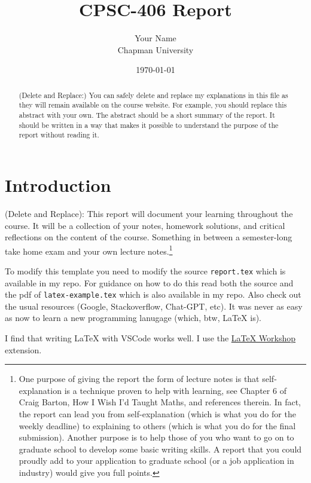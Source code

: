 \documentclass{article}
\title{CPSC-406 Report}
\author{Your Name  \\ Chapman University}
\date{\today}
\theoremstyle{theorem}
\theoremstyle{definition}
\theoremstyle{remark}
\begin{document}
\maketitle

\begin{abstract}
(Delete and Replace:) You can safely delete and replace my explanations in this file as they will remain available on the course website. For example, you should replace this abstract with your own. The abstract should be a short summary of the report. It should be written in a way that makes it possible to understand the purpose of the report without reading it.  
\end{abstract}

\setcounter{tocdepth}{3}
\tableofcontents

\section{Introduction}\label{intro}

(Delete and Replace): This report will document your learning throughout the course. It will be a collection of your notes, homework solutions, and critical reflections on the content of the course. Something in between a semester-long take home exam and your own lecture notes.\footnote{One purpose of giving the report the form of lecture notes is that self-explanation is a technique proven to help with learning, see Chapter 6 of Craig Barton, How I Wish I'd Taught Maths, and references therein. In fact, the report can lead you from self-explanation (which is what you do for the weekly deadline) to explaining to others (which is what you do for the final submission). Another purpose is to help those of you who want to go on to graduate school to develop some basic writing skills. A report that you could proudly add to your application to graduate school (or a job application in industry) would give you full points.}

To modify this template you need to modify the source \texttt{report.tex} which is available in my repo. For guidance on how to do this read both the source and the pdf of \texttt{latex-example.tex} which is also available in my repo. Also check out the usual resources (Google, Stackoverflow, Chat-GPT, etc). It was never as easy as now to learn a new programming lanugage (which, btw, \LaTeX{} is).

I find that writing \LaTeX{} with VSCode works well. I use the \href{https://marketplace.visualstudio.com/items?itemName=James-Yu.latex-workshop}{LaTeX Workshop} extension. 
\end{document}
